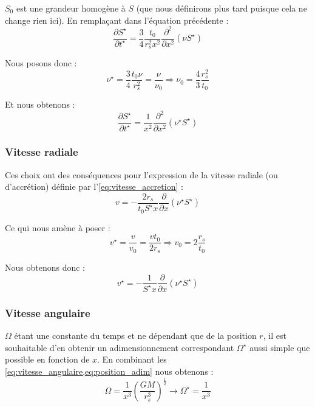 $S_0$ est une grandeur homogène à $S$ (que nous définirons plus tard puisque
cela ne change rien ici). En remplaçant dans l’équation précédente :
\begin{equation}
    \frac{\partial S^\star}{\partial t^\star} = \frac{3}{4} \frac{t_0}{r_s^2 x^2} \frac{\partial^2}{\partial x^2} \left(\nu S^\star\right)
\end{equation}

Nous posons donc :
\begin{equation}
    \label{eq:viscosite_adim}
    \nu^\star = \frac{3}{4} \frac{t_0 \nu}{r_s^2} = \frac{\nu}{\nu_0} \Rightarrow \nu_0 = \frac{4}{3} \frac{r_s^2}{t_0}
\end{equation}

Et nous obtenons :
\begin{equation}
    \label{eq:rel_densite_surface_adim}
    \frac{\partial S^\star}{\partial t^\star} = \frac{1}{x^2} \frac{\partial^2}{\partial x^2} \left(\nu^\star S^\star\right)
\end{equation}

\subsubsection{Vitesse radiale}

Ces choix ont des conséquences pour l’expression de la vitesse radiale (ou
d’accrétion) définie par l’\cref{eq:vitesse_accretion} :
\begin{equation}
    v = - \frac{2 r_s}{t_0 S^\star x} \frac{\partial}{\partial x} \left(\nu^\star S^\star\right)
\end{equation}

Ce qui nous amène à poser :
\begin{equation}
    v^\star = \frac{v}{v_0} = \frac{v t_0}{2 r_s} \Rightarrow v_0 = 2 \frac{r_s}{t_0}
\end{equation}

Nous obtenons donc :
\begin{equation}
    v^\star = - \frac{1}{S^\star x} \frac{\partial}{\partial x} \left(\nu^\star S^\star\right)
\end{equation}

\subsubsection{Vitesse angulaire}

$\Omega$ étant une constante du temps et ne dépendant que de la position $r$,
il est souhaitable d’en obtenir un adimensionnement correspondant
$\Omega^\star$ aussi simple que possible en fonction de $x$. En combinant les
\cref{eq:vitesse_angulaire,eq:position_adim} nous obtenons :
\begin{equation}
    \Omega = \frac{1}{x^3} \left( \frac{G M}{r_s^3} \right)^\frac{1}{2} \rightarrow \Omega^\star = \frac{1}{x^3}
\end{equation}

